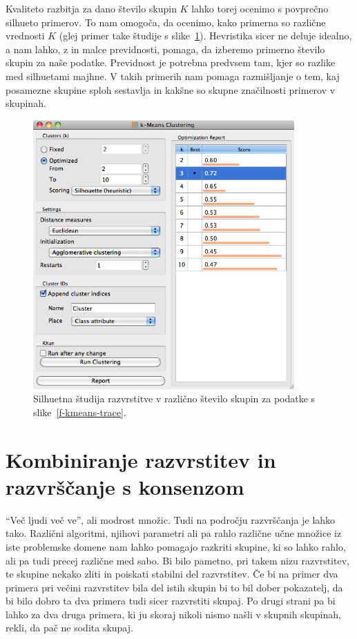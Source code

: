 Kvaliteto razbitja za dano število skupin $K$ lahko torej ocenimo s
povprečno silhueto primerov. To nam omogoča, da ocenimo, kako primerna
so različne vrednosti $K$ (glej primer take študije s
slike~\ref{f-kmeans-silhouette-study}). Hevristika sicer ne deluje
idealno, a nam lahko, z in malce previdnosti, pomaga, da izberemo
primerno število skupin za naše podatke. Previdnost je potrebna
predvsem tam, kjer so razlike med silhuetami majhne. V takih primerih
nam pomaga razmišljanje o tem, kaj posamezne skupine sploh sestavlja
in kakšne so skupne značilnosti primerov v skupinah.

\begin{figure}[htbp]
\begin{center}
\includegraphics[width=10cm]{slike/kmeans-silhouette-study.png}
\caption{Silhuetna študija razvrstitve v različno število skupin za
  podatke s slike~\ref{f-kmeans-trace}.}
\label{f-kmeans-silhouette-study}
\end{center}
\end{figure}

\section{Kombiniranje razvrstitev in razvrščanje s konsenzom}

``Več ljudi več ve'', ali modrost množic. Tudi na področju razvrščanja
je lahko tako. Različni algoritmi, njihovi parametri ali pa rahlo
različne učne množice iz iste problemske domene nam lahko pomagajo
razkriti skupine, ki so lahko rahlo, ali pa tudi precej različne med
sabo. Bi bilo pametno, pri takem nizu razvrstitev, te skupine nekako
zliti in poiskati stabilni del razvrstitev. Če bi na primer dva
primera pri večini razvrstitev bila del istih skupin bi to bil dober
pokazatelj, da bi bilo dobro ta dva primera tudi sicer razvrstiti
skupaj. Po drugi strani pa bi lahko za dva druga primera, ki ju skoraj
nikoli nismo našli v skupnih skupinah, rekli, da pač ne sodita skupaj.

